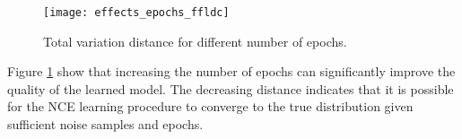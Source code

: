 \begin{figure}
  \centering
  \texttt{[image: effects\_epochs\_ffldc]}
  \caption{Total variation distance for different number of epochs.}
  \label{fig:effects_epochs_ffld}
\end{figure}

Figure \ref{fig:effects_epochs_ffld} show that increasing the number of epochs can significantly improve the quality of the learned model. The decreasing distance indicates that it is possible for the NCE learning procedure to converge to the true distribution given sufficient noise samples and epochs.